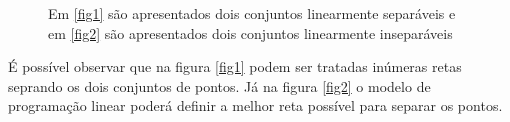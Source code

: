 \begin{figure}[!h]
\centering
{}
\qquad
{}
\label{img:linear_sepa}
\caption{Em \ref{fig1} são apresentados dois conjuntos linearmente separáveis e em \ref{fig2} são apresentados dois conjuntos linearmente inseparáveis}
\end{figure}

É possível observar que na figura \ref{fig1} podem ser tratadas inúmeras retas seprando os dois conjuntos de pontos. Já na figura \ref{fig2} o modelo de programação linear poderá definir a melhor reta possível para separar os pontos.

